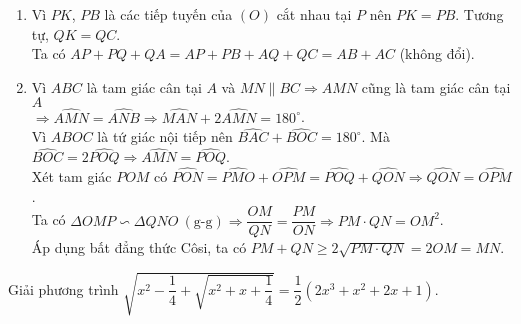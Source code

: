 \begin{ex}[9H3B7][9H2B6][9H2B6][9H3K7]
{\begin{enumerate}
\item Vì $PK$, $PB$ là các tiếp tuyến của $(O)$ cắt nhau tại $P$ nên $PK=PB$. Tương tự, $QK=QC$.\\
Ta có $AP+PQ+QA=AP+PB+AQ+QC=AB+AC$ (không đổi).
\item Vì $ABC$ là tam giác cân tại $A$ và $MN\parallel BC\Rightarrow AMN$ cũng là tam giác cân tại $A$\\
$\Rightarrow \widehat{AMN}=\widehat{ANB}\Rightarrow \widehat{MAN}+2\widehat{AMN}=180^{\circ}$.\\
Vì $ABOC$ là tứ giác nội tiếp nên $\widehat{BAC}+\widehat{BOC}=180^{\circ}$. Mà $\widehat{BOC}=2\widehat{POQ}\Rightarrow \widehat{AMN}=\widehat{POQ}$.\\
Xét tam giác $POM$ có $\widehat{PON}=\widehat{PMO}+\widehat{OPM}=\widehat{POQ}+\widehat{QON}\Rightarrow \widehat{QON}=\widehat{OPM}$.\\
Ta có $\Delta OMP\backsim \Delta QNO\ (\mbox{g-g})\Rightarrow \dfrac{OM}{QN}=\dfrac{PM}{ON}\Rightarrow PM\cdot QN=OM^{2}$.\\
Áp dụng bất đẳng thức Côsi, ta có $PM+QN\geq 2\sqrt{PM\cdot QN}=2OM=MN$.
\end{enumerate}
}
\end{ex}  
\begin{ex}[9D5G5]
Giải phương trình $\sqrt{x^2-\dfrac{1}{4}+\sqrt{x^2+x+\dfrac{1}{4}}}=\dfrac{1}{2}\left(2x^3+x^2+2x+1 \right)$.
\end{ex} 
